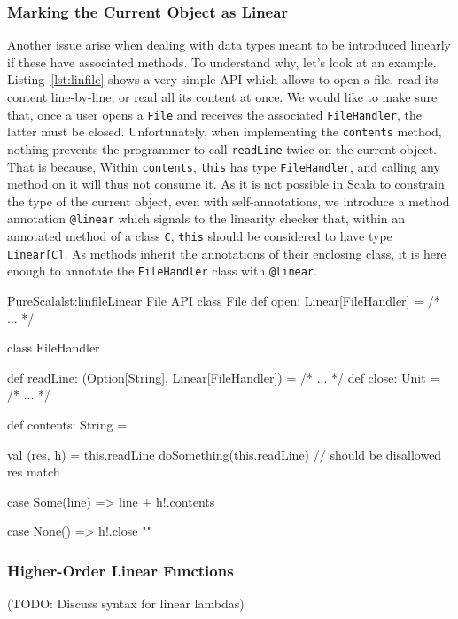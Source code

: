 \documentclass[a4paper,twoside]{article}
\newcommand{\TODO}[1]{\textcolor{YellowOrange}{(TODO: #1)}} %
\newcommand{\RefCode}[1]{Listing~\ref{#1}}
\newcommand{\stt}[1]{\texttt{\small{#1}}}
\begin{document}
\subsubsection*{Marking the Current Object as Linear}

Another issue arise when dealing with data types meant to be introduced linearly if these have associated methods. To understand why, let's look at an example. \RefCode{lst:linfile} shows a very simple API which allows to open a file, read its content line-by-line, or read all its content at once. We would like to make sure that, once a user opens a \stt{File} and receives the associated \stt{FileHandler}, the latter must be closed. Unfortunately, when implementing the \stt{contents} method, nothing prevents the programmer to call \stt{readLine} twice on the current object. That is because, Within \stt{contents}, \stt{this} has type \stt{FileHandler}, and calling any method on it will thus not consume it. As it is not possible in Scala to constrain the type of the current object, even with self-annotations, we introduce a method annotation \stt{@linear} which signals to the linearity checker that, within an annotated method of a class \stt{C}, \stt{this} should be considered to have type \stt{Linear[C]}. As methods inherit the annotations of their enclosing class, it is here enough to annotate the \stt{FileHandler} class with \stt{@linear}.

\begin{Code}{PureScala}{lst:linfile}{Linear File API}
class File {
  def open: Linear[FileHandler] = /* ... */
}

class FileHandler {
  def readLine: (Option[String], Linear[FileHandler]) = /* ... */
  def close: Unit = /* ... */
  
  def contents: String = {
    val (res, h) = this.readLine
    doSomething(this.readLine) // should be disallowed
    res match {
      case Some(line) =>
        line + h!.contents

      case None() =>
        h!.close
        ""
    }
  }
}
\end{Code}

\subsubsection*{Higher-Order Linear Functions}

\TODO{Discuss syntax for linear lambdas}
\end{document}
